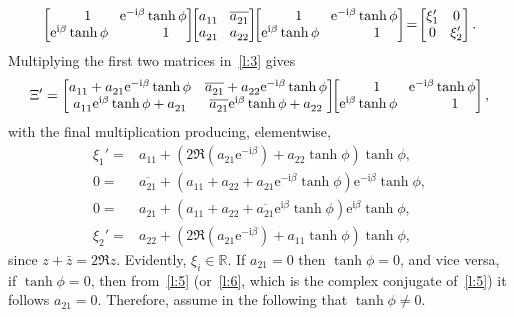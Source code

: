 \documentclass[a4paper,12pt,twoside]{article}
\begin{document}
\begin{equation}
  \begin{bmatrix}
  \hphantom{\mathrm{e}^{\mathrm{i}\beta}}1 & \!\mathrm{e}^{-\mathrm{i}\beta}\tanh\phi\\
  \mathrm{e}^{\mathrm{i}\beta}\tanh\phi & \!\hphantom{\mathrm{e}^{-\mathrm{i}\beta}}1
  \end{bmatrix}\!\!\begin{bmatrix}
  a_{11}^{} & \!\overline{a_{21}^{}}\\
  a_{21}^{} & \!a_{22}^{}
  \end{bmatrix}\!\!\begin{bmatrix}
  \hphantom{\mathrm{e}^{\mathrm{i}\beta}}1 & \!\mathrm{e}^{-\mathrm{i}\beta}\tanh\phi\\
  \mathrm{e}^{\mathrm{i}\beta}\tanh\phi & \!\hphantom{\mathrm{e}^{-\mathrm{i}\beta}}1
  \end{bmatrix}\!=\!\begin{bmatrix}
  \xi_1' & \!0\\
  0 & \!\xi_2'
  \end{bmatrix}.
  \label{l:3}
\end{equation}
Multiplying the first two matrices in~\eqref{l:3} gives
\begin{displaymath}
  \Xi'=\begin{bmatrix}
  a_{11}^{}+a_{21}^{}\mathrm{e}^{-\mathrm{i}\beta}\tanh\phi & \overline{a_{21}^{}}+a_{22}^{}\mathrm{e}^{-\mathrm{i}\beta}\tanh\phi\\
  a_{11}^{}\mathrm{e}^{\mathrm{i}\beta}\tanh\phi+a_{21}^{} & \overline{a_{21}^{}}\mathrm{e}^{\mathrm{i}\beta}\tanh\phi+a_{22}^{}
  \end{bmatrix}\!\!\begin{bmatrix}
  \hphantom{\mathrm{e}^{\mathrm{i}\beta}}1 & \!\mathrm{e}^{-\mathrm{i}\beta}\tanh\phi\\
  \mathrm{e}^{\mathrm{i}\beta}\tanh\phi & \!\hphantom{\mathrm{e}^{-\mathrm{i}\beta}}1
  \end{bmatrix},
\end{displaymath}
with the final multiplication producing, elementwise,
\begin{eqnarray}
    \xi_1'=&a_{11}^{}+(2\Re(a_{21}^{}\mathrm{e}^{-\mathrm{i}\beta})+a_{22}^{}\tanh\phi)\tanh\phi,\label{l:4}\\
    0=&\overline{a_{21}^{}}+(a_{11}^{}+a_{22}^{}+a_{21}^{}\mathrm{e}^{-\mathrm{i}\beta}\tanh\phi)\mathrm{e}^{-\mathrm{i}\beta}\tanh\phi,\label{l:5}\\
    0=&a_{21}^{}+(a_{11}^{}+a_{22}^{}+\overline{a_{21}^{}}\mathrm{e}^{\mathrm{i}\beta}\tanh\phi)\mathrm{e}^{\mathrm{i}\beta}\tanh\phi,\label{l:6}\\
    \xi_2'=&a_{22}^{}+(2\Re(a_{21}^{}\mathrm{e}^{-\mathrm{i}\beta})+a_{11}^{}\tanh\phi)\tanh\phi,\label{l:7}
\end{eqnarray}
since $z+\bar{z}=2\Re{z}$.  Evidently, $\xi_i\in\mathbb{R}$.  If
$a_{21}=0$ then $\tanh\phi=0$, and vice versa, if $\tanh\phi=0$, then
from~\eqref{l:5} (or~\eqref{l:6}, which is the complex conjugate
of~\eqref{l:5}) it follows $a_{21}=0$.  Therefore, assume in the
following that $\tanh\phi\ne 0$.
\end{document}
